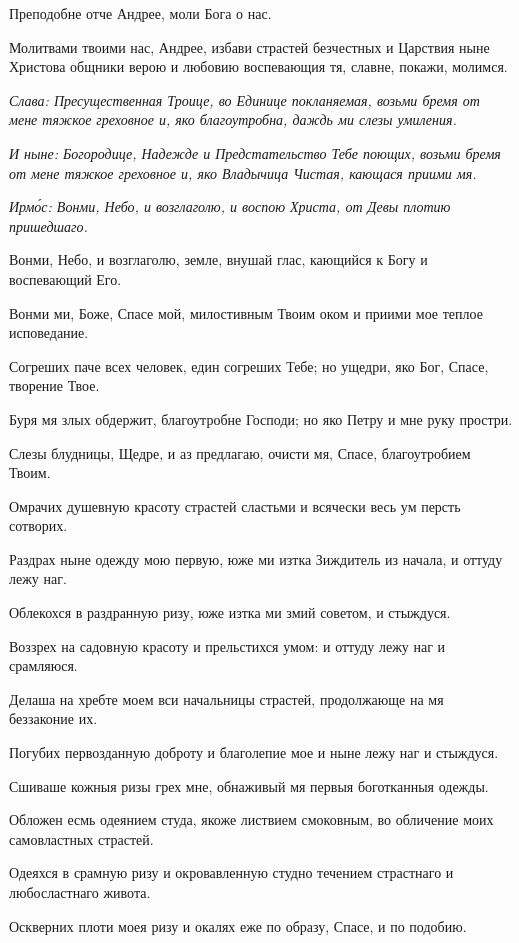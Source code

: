 Преподобне отче Андрее, моли Бога о нас.

Молитвами твоими нас, Андрее, избави страстей безчестных и Царствия ныне Христова общники верою и любовию воспевающия тя, славне, покажи, молимся.

\itshape Слава\normalfont{}: Пресущественная Троице, во Единице покланяемая, возьми бремя от мене тяжкое греховное и, яко благоутробна, даждь ми слезы умиления.

\itshape И ныне\normalfont{}: Богородице, Надежде и Предстательство Тебе поющих, возьми бремя от мене тяжкое греховное и, яко Владычица Чистая, кающася приими мя. 


\itshape Ирм\'{о}с\normalfont{}: Вонми, Небо, и возглаголю, и воспою Христа, от Девы плотию пришедшаго.

Вонми, Небо, и возглаголю, земле, внушай глас, кающийся к Богу и воспевающий Его.

Вонми ми, Боже, Спасе мой, милостивным Твоим оком и приими мое теплое исповедание.

Согреших паче всех человек, един согреших Тебе; но ущедри, яко Бог, Спасе, творение Твое.

Буря мя злых обдержит, благоутробне Господи; но яко Петру и мне руку простри.

Слезы блудницы, Щедре, и аз предлагаю, очисти мя, Спасе, благоутробием Твоим.

Омрачих душевную красоту страстей сластьми и всячески весь ум персть сотворих.

Раздрах ныне одежду мою первую, юже ми изтка Зиждитель из начала, и оттуду лежу наг.

Облекохся в раздранную ризу, юже изтка ми змий советом, и стыждуся.

Воззрех на садовную красоту и прельстихся умом: и оттуду лежу наг и срамляюся.

Делаша на хребте моем вси начальницы страстей, продолжающе на мя беззаконие их.

Погубих первозданную доброту и благолепие мое и ныне лежу наг и стыждуся.

Сшиваше кожныя ризы грех мне, обнаживый мя первыя боготканныя одежды.

Обложен есмь одеянием студа, якоже листвием смоковным, во обличение моих самовластных страстей.

Одеяхся в срамную ризу и окровавленную студно течением страстнаго и любосластнаго живота.

Оскверних плоти моея ризу и окалях еже по образу, Спасе, и по подобию.


